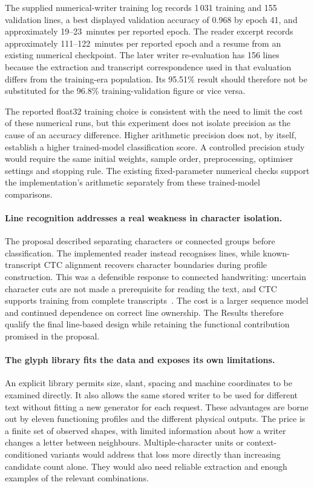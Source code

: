 The supplied numerical-writer training log records 1\,031 training and 155 validation lines, a best displayed validation accuracy of 0.968 by epoch 41, and approximately 19--23~minutes per reported epoch. The reader excerpt records approximately 111--122~minutes per reported epoch and a resume from an existing numerical checkpoint. The later writer re-evaluation has 156 lines because the extraction and transcript correspondence used in that evaluation differs from the training-era population. Its 95.51\% result should therefore not be substituted for the 96.8\% training-validation figure or vice versa.

The reported float32 training choice is consistent with the need to limit the cost of these numerical runs, but this experiment does not isolate precision as the cause of an accuracy difference. Higher arithmetic precision does not, by itself, establish a higher trained-model classification score. A controlled precision study would require the same initial weights, sample order, preprocessing, optimiser settings and stopping rule. The existing fixed-parameter numerical checks support the implementation's arithmetic separately from these trained-model comparisons.

\paragraph{Line recognition addresses a real weakness in character isolation.}
The proposal described separating characters or connected groups before classification. The implemented reader instead recognises lines, while known-transcript CTC alignment recovers character boundaries during profile construction. This was a defensible response to connected handwriting: uncertain character cuts are not made a prerequisite for reading the text, and CTC supports training from complete transcripts~\cite[pp.~2--3]{graves2006}. The cost is a larger sequence model and continued dependence on correct line ownership. The Results therefore qualify the final line-based design while retaining the functional contribution promised in the proposal.

\paragraph{The glyph library fits the data and exposes its own limitations.}
An explicit library permits size, slant, spacing and machine coordinates to be examined directly. It also allows the same stored writer to be used for different text without fitting a new generator for each request. These advantages are borne out by eleven functioning profiles and the different physical outputs. The price is a finite set of observed shapes, with limited information about how a writer changes a letter between neighbours. Multiple-character units or context-conditioned variants would address that loss more directly than increasing candidate count alone. They would also need reliable extraction and enough examples of the relevant combinations.

